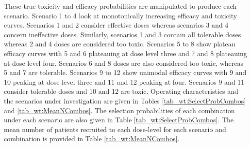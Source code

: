  These true toxicity and efficacy probabilities are manipulated to produce each scenario. Scenario 1 to 4 look at monotonically increasing efficacy and toxicity curves. Scenarios 1 and 2 consider effective doses whereas scenarios 3 and 4 concern ineffective doses. Similarly, scenarios 1 and 3 contain all tolerable doses whereas 2 and 4 doses are considered too toxic. Scenarios 5 to 8 show plateau efficacy curves with 5 and 6 plateauing at dose level three and 7 and 8 plateauing at dose level four. Scenarios 6 and 8 doses are also considered too toxic, whereas 5 and 7 are tolerable. Scenarios 9 to 12 show unimodal efficacy curves with 9 and 10 peaking at dose level three and 11 and 12 peaking at four. Scenarios 9 and 11 consider tolerable doses and 10 and 12 are toxic. Operating characteristics and the scenarios under investigation are given in Tables \ref{tab_wt:SelectProbCombos} and \ref{tab_wt:MeanNCombos}. The selection probabilities of each combination under each scenario are also given in Table \ref{tab_wt:SelectProbCombos}. The mean number of patients recruited to each dose-level for each scenario and combination is provided in Table \ref{tab_wt:MeanNCombos}.  
 
